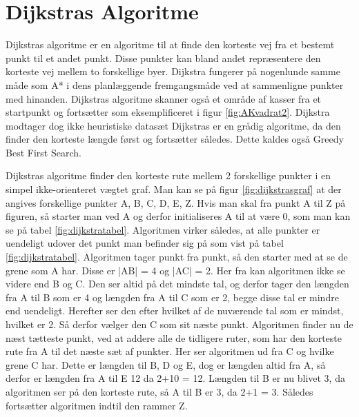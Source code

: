 \section{Dijkstras Algoritme}

Dijkstras algoritme er en algoritme til at finde den korteste vej fra et bestemt punkt til et andet punkt. Disse punkter kan bland andet repræsentere den korteste vej mellem to forskellige byer. Dijkstra fungerer på nogenlunde samme måde som A* i dens planlæggende fremgangsmåde ved at sammenligne punkter med hinanden. Dijkstras algoritme skanner også et område af kasser fra et startpunkt og fortsætter som eksemplificeret i figur \ref{fig:AKvadrat2}. Dijkstra modtager dog ikke heuristiske datasæt Dijkstras er en grådig algoritme, da den finder den korteste længde først og fortsætter således.\cite{DMATBOGEN} Dette kaldes også Greedy Best First Search.

\vspace{5mm}

Dijkstras algoritme finder den korteste rute mellem 2 forskellige punkter i en simpel ikke-orienteret vægtet graf. Man kan se på figur \ref{fig:dijkstrasgraf} at der angives forskellige punkter {A, B, C, D, E, Z}. Hvis man skal fra punkt A til Z på figuren, så starter man ved A og derfor initialiseres A til at være 0, som man kan se på tabel \ref{fig:dijkstratabel}. Algoritmen virker således, at alle punkter er uendeligt udover det punkt man befinder sig på som vist på tabel \ref{fig:dijkstratabel}. Algoritmen tager punkt fra punkt, så den starter med at se de grene som A har. Disse er |AB| = 4 og |AC| = 2. Her fra kan algoritmen ikke se videre end B og C. Den ser altid på det mindste tal, og derfor tager den længden fra A til B som er 4 og længden fra A til C som er 2, begge disse tal er mindre end uendeligt. Herefter ser den efter hvilket af de nuværende tal som er mindst, hvilket er 2. Så derfor vælger den C som sit næste punkt. Algoritmen finder nu de næst tætteste punkt, ved at addere alle de tidligere ruter, som har den korteste rute fra A til det næste sæt af punkter. Her ser algoritmen ud fra C og hvilke grene C har. Dette er længden til B, D og E, dog er længden altid fra A, så derfor er længden fra A til E 12 da 2+10 = 12. Længden til B er nu blivet 3, da algoritmen ser på den korteste rute, så A til B er 3, da 2+1 = 3. Således fortsætter algoritmen indtil den rammer Z.\cite{DMATBOGEN}

